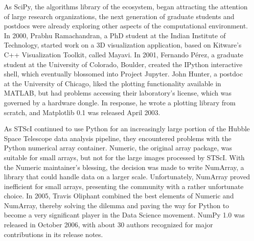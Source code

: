 \documentclass[fleqn,10pt]{wlscirep}
\begin{document}
As SciPy, the algorithms library of the ecosystem, began attracting the attention
of large research organizations,
the next generation of graduate students and postdocs were already exploring
other aspects of the computational environment.
In 2000, Prabhu Ramachandran, a PhD student at the Indian Institute of
Technology, started work on a 3D visualization application, based on
Kitware's C++ Visualization Toolkit\cite{schroeder:2006:VTK}, called
Mayavi\cite{mayavi-intro}.
In 2001, Fernando Pérez, a graduate student at the University of
Colorado, Boulder, created the IPython interactive shell, which 
eventually blossomed into Project Jupyter\cite{Kluyver:2016aa}.
John Hunter, a postdoc
at the University
of Chicago, liked the plotting functionality
available in MATLAB\cite{matlab}, but had problems accessing their laboratory's
license, which was governed by a hardware dongle.  In response, he
wrote a plotting library from scratch, and Matplotlib 0.1 was released
April 2003\cite{matplotlib-rel}.





As STScI continued to use Python for an increasingly large portion
of the Hubble Space Telescope data analysis pipeline, they encountered
problems with the Python numerical array container.
Numeric, the original array package, was
suitable for small arrays, but not for the large images processed by
STScI.  With the Numeric maintainer's blessing, the decision was made
to write NumArray\cite{greenfield2003numarray}, a library that could handle data on a larger
scale.  Unfortunately, NumArray proved inefficient for small arrays,
presenting the community with a rather unfortunate choice.  In 2005,
Travis Oliphant combined the best elements of Numeric and NumArray,
thereby solving the dilemma and paving the way for Python to become
a very significant player in the Data Science movement. NumPy
1.0 was released in October 2006\cite{numpy-1.0-tag}, with about 30
authors recognized for major contributions in its release notes.
\end{document}
